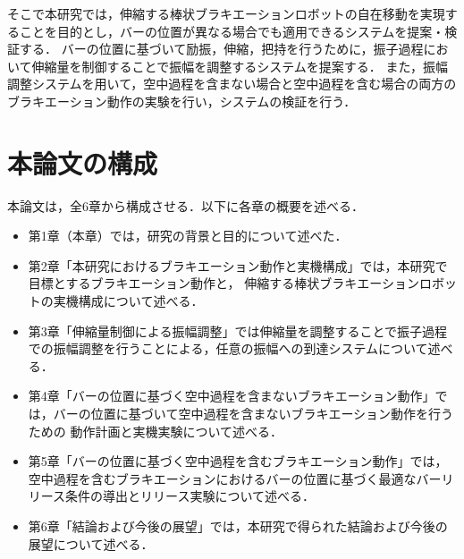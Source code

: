           そこで本研究では，伸縮する棒状ブラキエーションロボットの自在移動を実現することを目的とし，バーの位置が異なる場合でも適用できるシステムを提案・検証する．
          バーの位置に基づいて励振，伸縮，把持を行うために，振子過程において伸縮量を制御することで振幅を調整するシステムを提案する．
          また，振幅調整システムを用いて，空中過程を含まない場合と空中過程を含む場合の両方のブラキエーション動作の実験を行い，システムの検証を行う．
          
        \section{本論文の構成}

          本論文は，全6章から構成させる．以下に各章の概要を述べる．
          \begin{itemize}
            \item 第1章（本章）では，研究の背景と目的について述べた．
            \item 第2章「本研究におけるブラキエーション動作と実機構成」では，本研究で目標とするブラキエーション動作と，
            伸縮する棒状ブラキエーションロボットの実機構成について述べる．
            \item 第3章「伸縮量制御による振幅調整」では伸縮量を調整することで振子過程での振幅調整を行うことによる，任意の振幅への到達システムについて述べる．
            \item 第4章「バーの位置に基づく空中過程を含まないブラキエーション動作」では，バーの位置に基づいて空中過程を含まないブラキエーション動作を行うための
            動作計画と実機実験について述べる．
            \item 第5章「バーの位置に基づく空中過程を含むブラキエーション動作」では，空中過程を含むブラキエーションにおけるバーの位置に基づく最適なバーリリース条件の導出とリリース実験について述べる．         
            \item 第6章「結論および今後の展望」では，本研究で得られた結論および今後の展望について述べる．
          \end{itemize}

          

